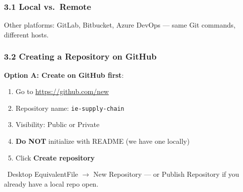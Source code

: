 \documentclass{beamer}
\newcommand{\desktoptip}[1]{\begin{block}{\faMousePointer\ Desktop Equivalent}#1\end{block}}
\begin{document}
\begin{frame}
\frametitle{3.1 Local vs.\ Remote}

\begin{center}
\end{center}

\vspace{4mm}
Other platforms: GitLab, Bitbucket, Azure DevOps --- same Git commands, different hosts.
\end{frame}

\begin{frame}
\frametitle{3.2 Creating a Repository on GitHub}

\textbf{Option A: Create on GitHub first}:
\begin{enumerate}
    \item Go to \url{https://github.com/new}
    \item Repository name: \texttt{ie-supply-chain}
    \item Visibility: Public or Private
    \item \textbf{Do NOT} initialize with README (we have one locally)
    \item Click \textbf{Create repository}
\end{enumerate}

\desktoptip{File $\rightarrow$ New Repository --- or Publish Repository if you already have a local repo open.}
\end{frame}
\end{document}

